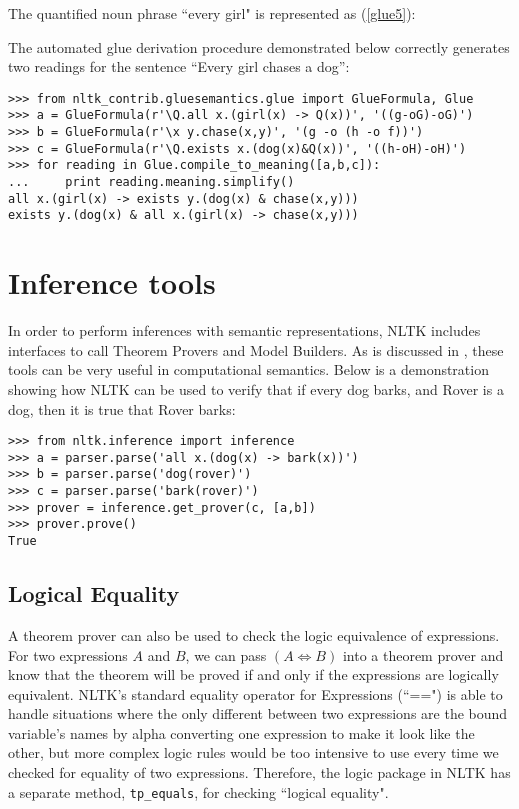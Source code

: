 \documentclass{article}
\newcommand{\dhgcode}[1]{{\tt #1}}
\begin{document}
The quantified noun phrase ``every girl" is represented as (\ref{glue5}):


The automated glue derivation procedure demonstrated below correctly generates two readings for the sentence ``Every girl chases a dog'':

\begin{verbatim}
>>> from nltk_contrib.gluesemantics.glue import GlueFormula, Glue
>>> a = GlueFormula(r'\Q.all x.(girl(x) -> Q(x))', '((g-oG)-oG)')
>>> b = GlueFormula(r'\x y.chase(x,y)', '(g -o (h -o f))')
>>> c = GlueFormula(r'\Q.exists x.(dog(x)&Q(x))', '((h-oH)-oH)')
>>> for reading in Glue.compile_to_meaning([a,b,c]):
...     print reading.meaning.simplify()
all x.(girl(x) -> exists y.(dog(x) & chase(x,y)))
exists y.(dog(x) & all x.(girl(x) -> chase(x,y)))
\end{verbatim}


\section{Inference tools}
In order to perform inferences with semantic representations, NLTK includes interfaces to call Theorem Provers and Model Builders.  As is discussed in \cite{BB}, these tools can be very useful in computational semantics.  Below is a demonstration showing how NLTK can be used to verify that if every dog barks, and Rover is a dog, then it is true that Rover barks:

\begin{verbatim}
>>> from nltk.inference import inference
>>> a = parser.parse('all x.(dog(x) -> bark(x))')
>>> b = parser.parse('dog(rover)')
>>> c = parser.parse('bark(rover)')
>>> prover = inference.get_prover(c, [a,b])
>>> prover.prove()
True
\end{verbatim}

\subsection{Logical Equality}
A theorem prover can also be used to check the logic equivalence of expressions.  For two expressions $A$ and $B$, we can pass $(A\iff B)$ into a theorem prover and know that the theorem will be proved if and only if the expressions are logically equivalent.  NLTK's standard equality operator for Expressions (``==") is able to handle situations where the only different between two expressions are the bound variable's names by alpha converting one expression to make it look like the other, but more complex logic rules would be too intensive to use every time we checked for equality of two expressions.  Therefore, the logic package in NLTK has a separate method, \dhgcode{tp\_equals}, for checking ``logical equality".
\end{document}

